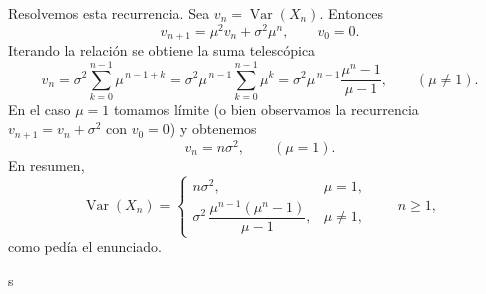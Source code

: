 Resolvemos esta recurrencia. Sea $v_n=\operatorname{Var}(X_n)$. Entonces
\[
v_{n+1}=\mu^2 v_n+\sigma^2\mu^n,\qquad v_0=0.
\]
Iterando la relación se obtiene la suma telescópica
\[
v_n=\sigma^2\sum_{k=0}^{n-1}\mu^{\,n-1+k}=\sigma^2\mu^{\,n-1}\sum_{k=0}^{n-1}\mu^{k}
=\sigma^2\mu^{\,n-1}\frac{\mu^{n}-1}{\mu-1},\qquad (\mu\neq1).
\]
En el caso $\mu=1$ tomamos límite (o bien observamos la recurrencia \(v_{n+1}=v_n+\sigma^2\) con \(v_0=0\)) y obtenemos
\[
v_n=n\sigma^2,\qquad (\mu=1).
\]
En resumen,
\[
\operatorname{Var}(X_n)=
\begin{cases}
n\sigma^2, & \mu=1,\\[6pt]
\sigma^2\,\dfrac{\mu^{n-1}(\mu^n-1)}{\mu-1}, & \mu\neq1,
\end{cases}\qquad n\ge1,
\]
como pedía el enunciado.






s